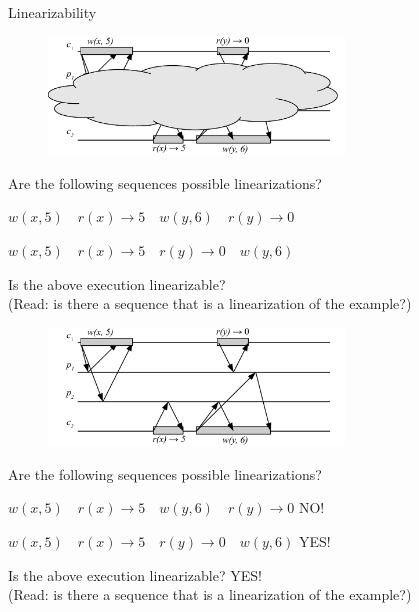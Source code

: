 \begin{frame}{Linearizability}

\begin{overprint}
\begin{figure}
\includegraphics[width=0.7\textwidth]{lin-02}
\end{figure}

\begin{example}
\BI
\item Are the following sequences possible linearizations?
\BI
\item $w(x,5) \quad r(x) \rightarrow 5 \quad w(y,6) \quad r(y) \rightarrow 0$
\item $w(x,5) \quad r(x) \rightarrow 5 \quad r(y) \rightarrow 0 \quad w(y,6)$
\EI
\item Is the above execution linearizable?\\ (Read: is there a sequence that is a linearization of the example?)
\EI
\end{example}

\begin{figure}
\includegraphics[width=0.7\textwidth]{lin-02n}
\end{figure}

\begin{example}
\BI
\item Are the following sequences possible linearizations?
\BI
\item $w(x,5) \quad r(x) \rightarrow 5 \quad w(y,6) \quad r(y) \rightarrow 0$ \qquad NO!
\item $w(x,5) \quad r(x) \rightarrow 5 \quad r(y) \rightarrow 0 \quad w(y,6)$ \qquad YES!
\EI
\item Is the above execution linearizable? \qquad YES!\\ (Read: is there a sequence that is a linearization of the example?)
\EI

\end{example}

\end{overprint}

\end{frame}

